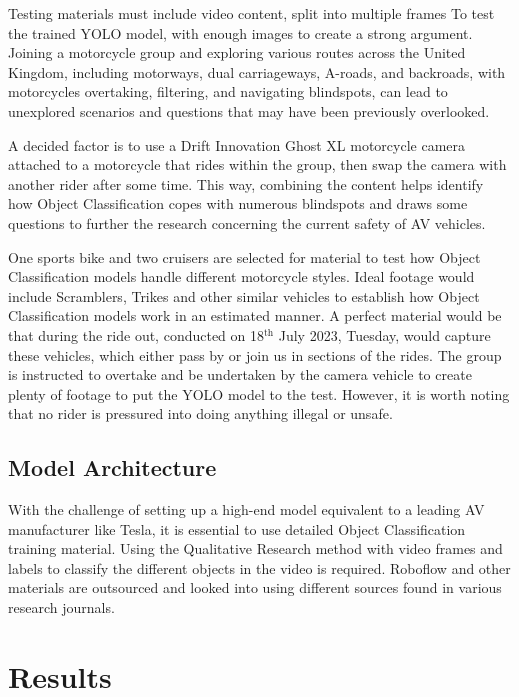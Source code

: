 \documentclass[conference]{IEEEtran}
\begin{document}
		Testing materials must include video content, split into multiple frames To test the trained YOLO model, with enough images to create a strong argument. Joining a motorcycle group and exploring various routes across the United Kingdom, including motorways, dual carriageways, A-roads, and backroads, with motorcycles overtaking, filtering, and navigating blindspots, can lead to unexplored scenarios and questions that may have been previously overlooked.
					
		A decided factor is to use a Drift Innovation Ghost XL motorcycle camera attached to a motorcycle that rides within the group, then swap the camera with another rider after some time. This way, combining the content helps identify how Object Classification copes with numerous blindspots and draws some questions to further the research concerning the current safety of AV vehicles. 
		
		One sports bike and two cruisers are selected for material to test how Object Classification models handle different motorcycle styles. Ideal footage would include Scramblers, Trikes and other similar vehicles to establish how Object Classification models work in an estimated manner. A perfect material would be that during the ride out, conducted on 18$^\text{th}$ July 2023, Tuesday, would capture these vehicles, which either pass by or join us in sections of the rides. The group is instructed to overtake and be undertaken by the camera vehicle to create plenty of footage to put the YOLO model to the test. However, it is worth noting that no rider is pressured into doing anything illegal or unsafe.

	\subsection{Model Architecture}
		With the challenge of setting up a high-end model equivalent to a leading AV manufacturer like Tesla, it is essential to use detailed Object Classification training material. Using the Qualitative Research method with video frames and labels to classify the different objects in the video is required. Roboflow and other materials are outsourced and looked into using different sources found in various research journals.

\section{Results}
\end{document}
